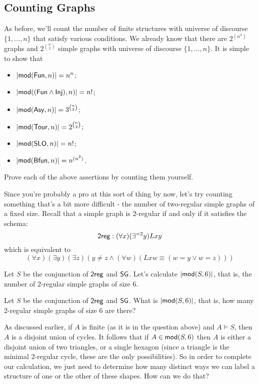 \subsection*{Counting Graphs}
As before, we'll count the number of finite structures with universe of discourse $\{1,\ldots,n\}$ that satisfy various conditions. We already know that there are $2^{(n^2)}$ graphs and $2^{\binom{n}{2}}$ simple graphs with universe of discourse $\{1,\ldots,n\}$. It is simple to show that
\begin{itemize}
\item
$\mbox{$|\mbox{$\mathsf{mod}(\mbox{$\mathsf{Fun}$},n)$}|$}= n^n$;
\item
$\mbox{$|\mbox{$\mathsf{mod}((\mbox{$\mathsf{Fun}$}\wedge\mbox{$\mathsf{Inj}$}),n)$}|$}= n!$;
\item
$\mbox{$|\mbox{$\mathsf{mod}(\mbox{$\mathsf{Asy}$},n)$}|$}= 3^{\binom{n}{2}}$;
\item
$\mbox{$|\mbox{$\mathsf{mod}(\mbox{$\mathsf{Tour}$},n)$}|$}= 2^{\binom{n}{2}}$;
\item
$\mbox{$|\mbox{$\mathsf{mod}(\mbox{$\mathsf{SLO}$},n)$}|$}= n!$;
\item
$\mbox{$|\mbox{$\mathsf{mod}(\mbox{$\mathsf{Bfun}$},n)$}|$}= n^{(n^2)}$.
\end{itemize}

\begin{aside}
    Prove each of the above assertions by counting them yourself. 
\end{aside}

Since you're probably a pro at this sort of thing by now, let's try counting something that's a bit more difficult - the number of two-regular simple graphs of a fixed size. Recall that a simple graph is 2-regular if and only if it satisfies the schema:
\[
    \mbox{$\mathsf{2reg}$}: (\forall x)(\exists^{=2}y)Lxy
\]
which is equivalent to 
\[
    (\forall x)(\exists y)(\exists z)(y\neq z\wedge(\forall w)(Lxw\equiv(w=y\vee w=z)))
\]

Let $S$ be the conjunction of $\mbox{$\mathsf{2reg}$}$ and $\mbox{$\mathsf{SG}$}$. Let's calculate $\mbox{$|\mbox{$\mathsf{mod}(S,6)$}|$}$, that is, the number of 2-regular simple graphs of size 6. 

\begin{example}
Let $S$ be the conjunction of $\mbox{$\mathsf{2reg}$}$ and $\mbox{$\mathsf{SG}$}$. What is $\mbox{$|\mbox{$\mathsf{mod}(S,6)$}|$}$, that is, how many 2-regular simple graphs of size 6 are there? 
\end{example}

As discussed earlier, if $A$ is finite (as it is in the question above) and $A \models S$, then $A$ is a disjoint union of cycles. It follows that if $A \in \mbox{$\mathsf{mod}(S,6)$}$ then $A$ is either a disjoint union of two triangles, or a single hexagon (since a triangle is the minimal 2-regular cycle, these are the only possibilities). So in order to complete our calculation, we just need to determine how many distinct ways we can label a structure of one or the other of these shapes. How can we do that?


